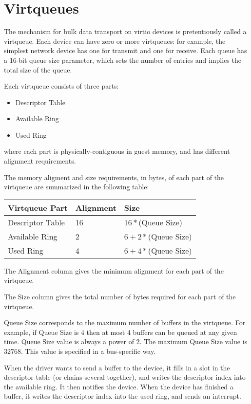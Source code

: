 \section{Virtqueues}\label{sec:Basic Facilities of a Virtio Device / Virtqueues}

The mechanism for bulk data transport on virtio devices is
pretentiously called a virtqueue. Each device can have zero or more
virtqueues: for example, the simplest network device has one for
transmit and one for receive.  Each queue has a 16-bit queue size
parameter, which sets the number of entries and implies the total size
of the queue.

Each virtqueue consists of three parts:

\begin{itemize}
\item Descriptor Table
\item Available Ring
\item Used Ring
\end{itemize}

where each part is physically-contiguous in guest memory,
and has different alignment requirements.

The memory aligment and size requirements, in bytes, of each part of the
virtqueue are summarized in the following table:

\begin{tabular}{|l|l|l|}
\hline
Virtqueue Part    & Alignment & Size \\
\hline \hline
Descriptor Table  & 16        & $16 * $(Queue Size) \\
\hline
Available Ring    & 2         & $6 + 2 * $(Queue Size) \\
 \hline
Used Ring         & 4         & $6 + 4 * $(Queue Size) \\
 \hline
\end{tabular}

The Alignment column gives the minimum alignment for each part
of the virtqueue.

The Size column gives the total number of bytes required for each
part of the virtqueue.

Queue Size corresponds to the maximum number of buffers in the
virtqueue.  For example, if Queue Size is 4 then at most 4 buffers
can be queued at any given time.  Queue Size value is always a
power of 2.  The maximum Queue Size value is 32768.  This value
is specified in a bus-specific way.

When the driver wants to send a buffer to the device, it fills in
a slot in the descriptor table (or chains several together), and
writes the descriptor index into the available ring.  It then
notifies the device. When the device has finished a buffer, it
writes the descriptor index into the used ring, and sends an interrupt.

